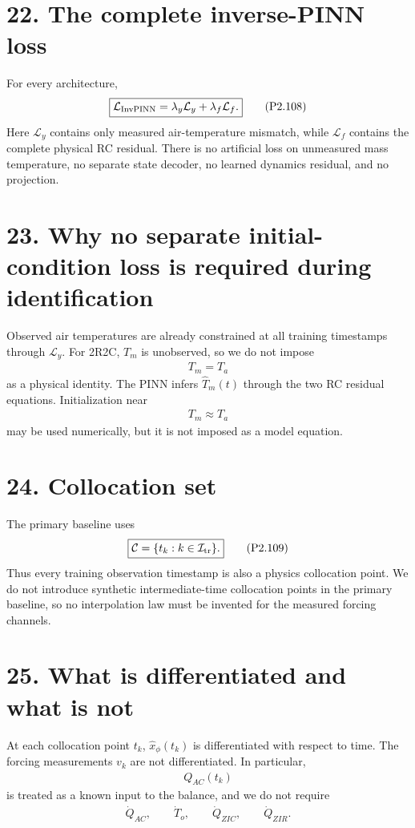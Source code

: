 \documentclass[11pt]{article}
\begin{document}
\section*{22. The complete inverse-PINN loss}
For every architecture,
\begin{align}
\boxed{\mathcal L_{\rm InvPINN}=\lambda_y\mathcal L_y+\lambda_f\mathcal L_f.}
\tag{P2.108}
\end{align}
Here \(\mathcal L_y\) contains only measured air-temperature mismatch, while \(\mathcal L_f\) contains the complete physical RC residual. There is no artificial loss on unmeasured mass temperature, no separate state decoder, no learned dynamics residual, and no projection.

\section*{23. Why no separate initial-condition loss is required during identification}
Observed air temperatures are already constrained at all training timestamps through \(\mathcal L_y\). For 2R2C, \(T_m\) is unobserved, so we do not impose
\begin{align}
T_m=T_a
\end{align}
as a physical identity. The PINN infers \(\widehat T_m(t)\) through the two RC residual equations. Initialization near
\begin{align}
T_m\approx T_a
\end{align}
may be used numerically, but it is not imposed as a model equation.

\section*{24. Collocation set}
The primary baseline uses
\begin{align}
\boxed{\mathcal C=\{t_k:k\in\mathcal I_{\rm tr}\}.}
\tag{P2.109}
\end{align}
Thus every training observation timestamp is also a physics collocation point. We do not introduce synthetic intermediate-time collocation points in the primary baseline, so no interpolation law must be invented for the measured forcing channels.

\section*{25. What is differentiated and what is not}
At each collocation point \(t_k\), \(\widehat x_\phi(t_k)\) is differentiated with respect to time. The forcing measurements \(v_k\) are not differentiated. In particular,
\begin{align}
Q_{AC}(t_k)
\end{align}
is treated as a known input to the balance, and we do not require
\begin{align}
\dot Q_{AC},\qquad \dot T_o,\qquad \dot Q_{ZIC},\qquad \dot Q_{ZIR}.
\end{align}
\end{document}
